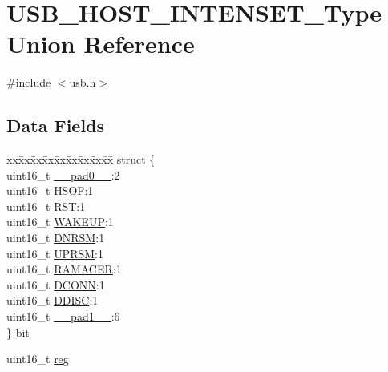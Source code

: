 \hypertarget{union_u_s_b___h_o_s_t___i_n_t_e_n_s_e_t___type}{}\section{U\+S\+B\+\_\+\+H\+O\+S\+T\+\_\+\+I\+N\+T\+E\+N\+S\+E\+T\+\_\+\+Type Union Reference}
\label{union_u_s_b___h_o_s_t___i_n_t_e_n_s_e_t___type}


{\ttfamily \#include $<$usb.\+h$>$}

\subsection*{Data Fields}
\begin{DoxyCompactItemize}
\item 
\begin{tabbing}
xx\=xx\=xx\=xx\=xx\=xx\=xx\=xx\=xx\=\kill
struct \{\\
\>uint16\_t \mbox{\hyperlink{union_u_s_b___h_o_s_t___i_n_t_e_n_s_e_t___type_a77132c2c26a75f5b8751b235cda23828}{\_\_pad0\_\_}}:2\\
\>uint16\_t \mbox{\hyperlink{union_u_s_b___h_o_s_t___i_n_t_e_n_s_e_t___type_a7f8340840d46e445277a0f7de01eef32}{HSOF}}:1\\
\>uint16\_t \mbox{\hyperlink{union_u_s_b___h_o_s_t___i_n_t_e_n_s_e_t___type_abef8327bfd071009d10633030379e701}{RST}}:1\\
\>uint16\_t \mbox{\hyperlink{union_u_s_b___h_o_s_t___i_n_t_e_n_s_e_t___type_a8daebdfb4a00acfdbe16023d636e3887}{WAKEUP}}:1\\
\>uint16\_t \mbox{\hyperlink{union_u_s_b___h_o_s_t___i_n_t_e_n_s_e_t___type_ab69050f1de488116f29c04177bb64953}{DNRSM}}:1\\
\>uint16\_t \mbox{\hyperlink{union_u_s_b___h_o_s_t___i_n_t_e_n_s_e_t___type_a21d16bc73d976e53f035b7dd20e1160b}{UPRSM}}:1\\
\>uint16\_t \mbox{\hyperlink{union_u_s_b___h_o_s_t___i_n_t_e_n_s_e_t___type_a0391330e7e210b908b26fec3fe07622f}{RAMACER}}:1\\
\>uint16\_t \mbox{\hyperlink{union_u_s_b___h_o_s_t___i_n_t_e_n_s_e_t___type_a8b0d608359caac0545b9a34e9eb09370}{DCONN}}:1\\
\>uint16\_t \mbox{\hyperlink{union_u_s_b___h_o_s_t___i_n_t_e_n_s_e_t___type_abc0acd8a4414aca610fd40d2a08cbb94}{DDISC}}:1\\
\>uint16\_t \mbox{\hyperlink{union_u_s_b___h_o_s_t___i_n_t_e_n_s_e_t___type_ab72e3a1f2f7db8695c60c658f5a0f11a}{\_\_pad1\_\_}}:6\\
\} \mbox{\hyperlink{union_u_s_b___h_o_s_t___i_n_t_e_n_s_e_t___type_a5dae79bb9153ebe0eb83afbc8b1e8d7c}{bit}}\\

\end{tabbing}\item 
uint16\+\_\+t \mbox{\hyperlink{union_u_s_b___h_o_s_t___i_n_t_e_n_s_e_t___type_a11760f5020019f4aa8cb02e694f7cc44}{reg}}
\end{DoxyCompactItemize}


